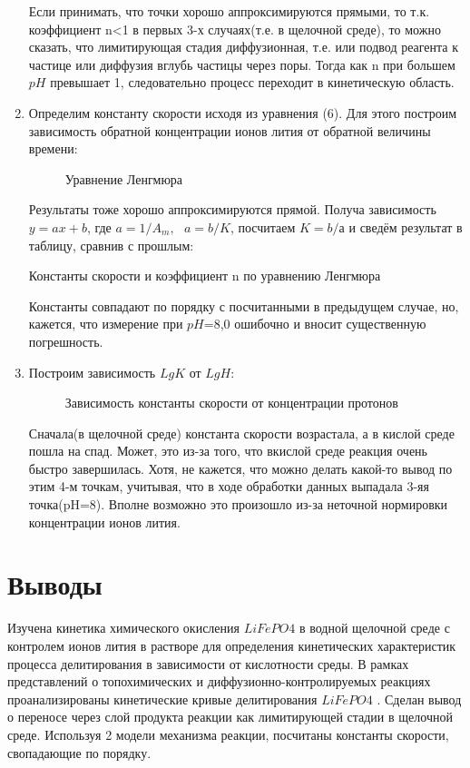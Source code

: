 \documentclass[a4paper,12pt]{article} %
\begin{document}
\begin{enumerate}
Если принимать, что точки хорошо аппроксимируются прямыми, то т.к. коэффициент n<1 в первых 3-х случаях(т.е. в щелочной среде), то можно сказать, что лимитирующая стадия диффузионная, т.е. или подвод реагента к частице или диффузия вглубь частицы через поры. Тогда как n при большем $pH$ превышает 1, следовательно процесс переходит в кинетическую область.
\item Определим константу скорости исходя из уравнения (6). Для этого построим зависимость обратной концентрации ионов лития от обратной величины времени:
\begin{figure}[H]
	\caption{\centering Уравнение Ленгмюра }
	\label{pic:5}
\end{figure}
Результаты тоже хорошо аппроксимируются прямой. Получа зависимость $y=ax+b$, где $a=1/A_m,\ \ \ a = b/K$, посчитаем $K=b/а$ и сведём результат в таблицу, сравнив с прошлым:
\begin{table}[H]
	\caption{\centering Константы скорости и коэффициент n по уравнению Ленгмюра}
    \label{tab:my table} 
    \end{table}
Константы совпадают по порядку с посчитанными в предыдущем случае, но, кажется, что измерение при $pH$=8,0 ошибочно и вносит существенную погрешность.
\item Построим зависимость $LgK$ от $LgH$:
\begin{figure}[H]
	\caption{\centering Зависимость константы скорости от концентрации протонов }
	\label{pic:5}
\end{figure}
Сначала(в щелочной среде) константа скорости возрастала, а в кислой среде пошла на спад. Может, это из-за того, что вкислой среде реакция очень быстро завершилась. Хотя, не кажется, что можно делать какой-то вывод по этим 4-м точкам, учитывая, что в ходе обработки данных выпадала 3-яя точка(pH=8). Вполне возможно это произошло из-за неточной нормировки концентрации ионов лития.
\end{enumerate}
\section{Выводы}Изучена кинетика химического окисления 
$LiFePO4$ в водной щелочной среде с  
контролем ионов лития в растворе для определения кинетических характеристик процесса делитирования в зависимости от кислотности среды.
В  рамках представлений о  топохимических 
и диффузионно-контролируемых реакциях проанализированы кинетические кривые делитирования $LiFePO4$ . Сделан вывод о переносе через слой продукта 
реакции как лимитирующей стадии в щелочной среде. Используя 2 модели механизма реакции, посчитаны константы скорости, свопадающие по порядку.
\end{document}
